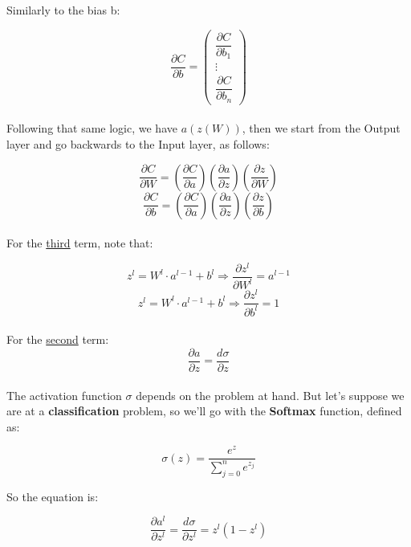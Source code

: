 \documentclass[12pt]{article}
\begin{document}
Similarly to the bias b:

\begin{equation}
\dfrac{\partial C}{\partial b}
=
\begin{pmatrix}
\dfrac{\partial C}{\partial b_{1}} \\
\vdots  \\
\dfrac{\partial C}{\partial b_{n}} 
\end{pmatrix}
\end{equation} 
\mbox{} \\

Following that same logic, we have $a(z(W))$, then we start from the Output layer and go backwards to the Input layer, as follows:

\begin{equation}
    \dfrac{\partial C}{\partial W} = \left( \dfrac{\partial C}{\partial a}\right) \left( \dfrac{\partial a}{\partial z}\right) \left(\dfrac{\partial z}{\partial W} \right)
\end{equation}
\begin{equation}
    \dfrac{\partial C}{\partial b} = \left( \dfrac{\partial C}{\partial a}\right) \left( \dfrac{\partial a}{\partial z}\right) \left(\dfrac{\partial z}{\partial b} \right)
\end{equation} \mbox{} \\

For the \underline{third} term, note that:

\[
z^{l} = W^{l}\cdot a^{l-1} + b^{l} \Rightarrow  \dfrac{\partial z^{l}}{\partial W^{l}} = a^{l-1}
\]
\[
z^{l} = W^{l}\cdot a^{l-1} + b^{l} \Rightarrow  \dfrac{\partial z^{l}}{\partial b^{l}} = 1
\] \mbox{} \\



For the \underline{second} term:
\[
\dfrac{\partial a}{\partial z} = \dfrac{d \sigma}{\partial z}
\] \mbox{} \\

The activation function $\sigma$ depends on the problem at hand. But let's suppose we are at a \textbf{classification} problem, so we'll go with the \textbf{Softmax} function, defined as:

\begin{equation}
    \sigma (z) = \dfrac{e^{z}}{\sum_{j=0}^{n} e^{z_{j}}}
\end{equation}

So the equation is:

\[
\dfrac{\partial a^{l}}{\partial z^{l}} = \dfrac{d \sigma}{\partial z^{l}} = z^{l} ( 1 - z^{l} )
\] \mbox{} \\
\end{document}
